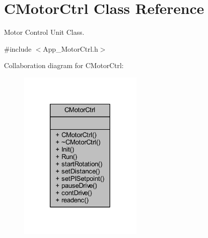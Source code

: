 \hypertarget{class_c_motor_ctrl}{}\section{C\+Motor\+Ctrl Class Reference}
\label{class_c_motor_ctrl}


Motor Control Unit Class.  




{\ttfamily \#include $<$App\+\_\+\+Motor\+Ctrl.\+h$>$}



Collaboration diagram for C\+Motor\+Ctrl\+:
\nopagebreak
\begin{figure}[H]
\begin{center}
\leavevmode
\includegraphics[width=170pt]{class_c_motor_ctrl__coll__graph}
\end{center}
\end{figure}
